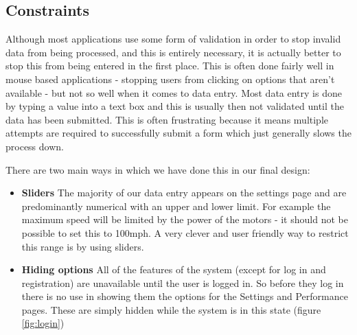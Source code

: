 \documentclass[a4paper]{report}
\begin{document}
{\subsection*{Constraints}
Although most applications use some form of validation in order to stop invalid data from being processed, and this is entirely necessary, it is actually better to stop this from being entered in the first place. This is often done fairly well in mouse based applications - stopping users from clicking on options that aren't available - but not so well when it comes to data entry. Most data entry is done by typing a value into a text box and this is usually then not validated until the data has been submitted. This is often frustrating because it means multiple attempts are required to successfully submit a form which just generally slows the process down.

There are two main ways in which we have done this in our final design:
\begin{itemize}
\item \textbf{Sliders} The majority of our data entry appears on the settings page and are predominantly numerical with an upper and lower limit. For example the maximum speed will be limited by the power of the motors - it should not be possible to set this to 100mph. A very clever and user friendly way to restrict this range is by using sliders. 
\item \textbf{Hiding options} All of the features of the system (except for log in and registration) are unavailable until the user is logged in. So before they log in there is no use in showing them the options for the Settings and Performance pages. These are simply hidden while the system is in this state (figure \ref{fig:login})
\end{itemize}

}
\end{document}
